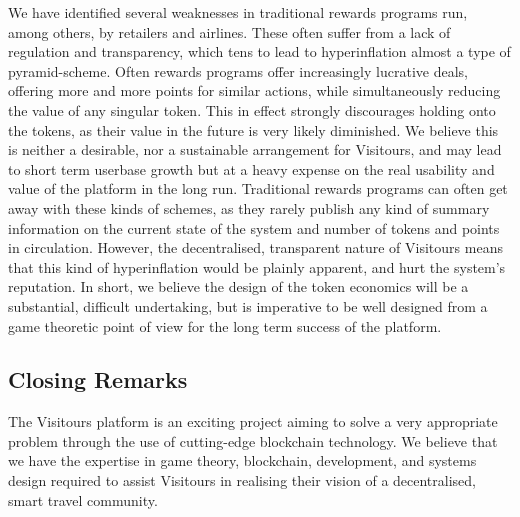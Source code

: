 \documentclass[fontsize=12pt,a4paper]{article}
\begin{document}
We have identified several weaknesses in traditional rewards programs run, among others, by retailers and airlines. These often suffer from a lack of regulation and transparency, which tens to lead to hyperinflation almost a type of pyramid-scheme. Often rewards programs offer increasingly lucrative deals, offering more and more points for similar actions, while simultaneously reducing the value of any singular token. This in effect strongly discourages holding onto the tokens, as their value in the future is very likely diminished. We believe this is neither a desirable, nor a sustainable arrangement for Visitours, and may lead to short term userbase growth but at a heavy expense on the real usability and value of the platform in the long run. Traditional rewards programs can often get away with these kinds of schemes, as they rarely publish any kind of summary information on the current state of the system and number of tokens and points in circulation. However, the decentralised, transparent nature of Visitours means that this kind of hyperinflation would be plainly apparent, and hurt the system's reputation. In short, we believe the design of the token economics will be a substantial, difficult undertaking, but is imperative to be well designed from a game theoretic point of view for the long term success of the platform.

\subsection*{Closing Remarks}

The Visitours platform is an exciting project aiming to solve a very appropriate problem through the use of cutting-edge blockchain technology. We believe that we have the expertise in game theory, blockchain, development, and systems design required to assist Visitours in realising their vision of a decentralised, smart travel community.
\end{document}
